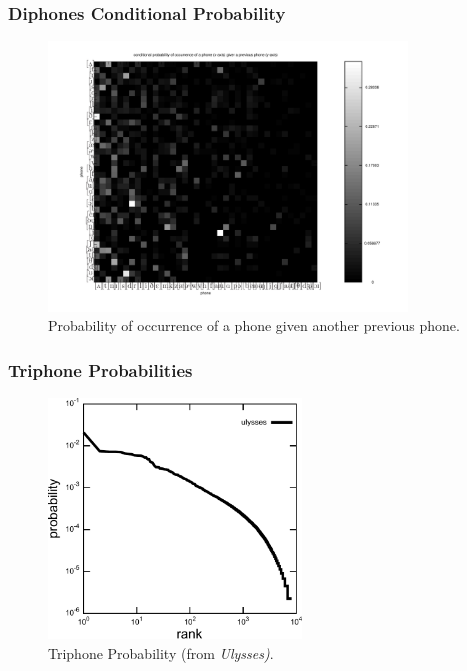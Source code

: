 \documentclass{beamer}
\begin{document}
\frame
{
  \frametitle{Diphones Conditional Probability}
\vspace{-0.5cm}
\begin{figure}[h!]
\centering
\includegraphics[width=0.85\textwidth]{images/diphones_cond_probability_en.pdf}
\vspace{-0.7cm}
\caption{Probability of occurrence of a phone given another previous phone.}
\label{fig:diphones_cond_probability_en}
\end{figure} 
}





\frame
{
  \frametitle{Triphone Probabilities}
  \begin{figure}[h!]
  \centering
  \includegraphics[width=0.6\textwidth]{imagespresentation/ulysses_triphones_probabilities.pdf}
  \caption{Triphone Probability (from \emph{Ulysses)}.}
  \label{fig:ulysses_triphones_probabilities}
  \end{figure} 
}
\end{document}
